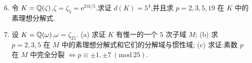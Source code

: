 \begin{enumerate}[1.]
  \setcounter{enumi}{5}
  \item 令 $K=\mathbb{Q}(\zeta)$,$\zeta=\zeta_5=\mathrm{e}^{2\pi\mathrm{i}/5}$.求证 $d(K)=5^4$,并且求 $p=2,3,5,19$ 在 $K$ 中的素理想分解式.
  \item 设 $K=\mathbb{Q}(\omega)$,$\omega=\zeta_{25}$.
        (a) 求证 $K$ 有惟一的一个 $5$ 次子域 $M$;
        (b) 求 $p=2,3,5$ 在 $M$ 中的素理想分解式和它们的分解域与惯性域;
        (c) 求证:素数 $p$ 在 $M$ 中完全分裂 $\Leftrightarrow p\equiv\pm 1,\pm 7\ (\mathrm{mod}\ 25)$.
\end{enumerate}
